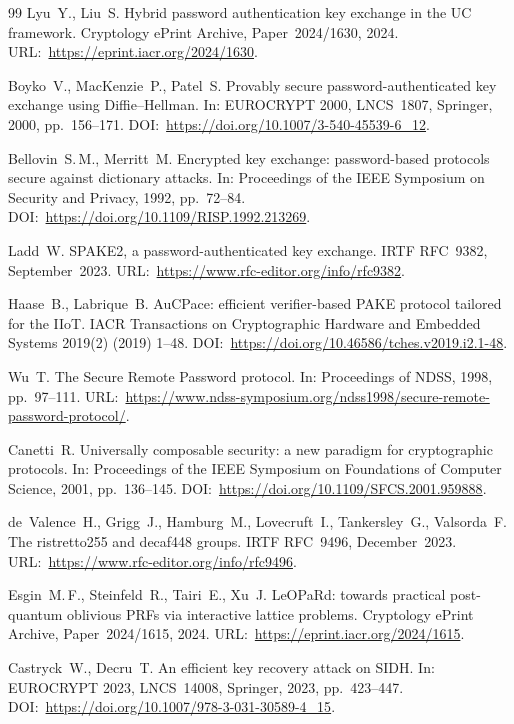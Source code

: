\documentclass[preprint,12pt]{elsarticle}
\theoremstyle{remark}
\begin{document}
\begin{thebibliography}{99}
Lyu~Y., Liu~S.
Hybrid password authentication key exchange in the UC framework.
Cryptology ePrint Archive, Paper~2024/1630, 2024.
URL:~\url{https://eprint.iacr.org/2024/1630}.

Boyko~V., MacKenzie~P., Patel~S.
Provably secure password-authenticated key exchange using Diffie--Hellman.
In: EUROCRYPT 2000, LNCS~1807, Springer, 2000, pp.~156--171.
DOI:~\url{https://doi.org/10.1007/3-540-45539-6_12}.

Bellovin~S.\,M., Merritt~M.
Encrypted key exchange: password-based protocols secure against dictionary attacks.
In: Proceedings of the IEEE Symposium on Security and Privacy, 1992, pp.~72--84.
DOI:~\url{https://doi.org/10.1109/RISP.1992.213269}.

Ladd~W.
SPAKE2, a password-authenticated key exchange.
IRTF RFC~9382, September~2023.
URL:~\url{https://www.rfc-editor.org/info/rfc9382}.

Haase~B., Labrique~B.
AuCPace: efficient verifier-based PAKE protocol tailored for the IIoT.
IACR Transactions on Cryptographic Hardware and Embedded Systems 2019(2) (2019) 1--48.
DOI:~\url{https://doi.org/10.46586/tches.v2019.i2.1-48}.

Wu~T.
The Secure Remote Password protocol.
In: Proceedings of NDSS, 1998, pp.~97--111.
URL:~\url{https://www.ndss-symposium.org/ndss1998/secure-remote-password-protocol/}.

Canetti~R.
Universally composable security: a new paradigm for cryptographic protocols.
In: Proceedings of the IEEE Symposium on Foundations of Computer Science, 2001, pp.~136--145.
DOI:~\url{https://doi.org/10.1109/SFCS.2001.959888}.

de~Valence~H., Grigg~J., Hamburg~M., Lovecruft~I., Tankersley~G.,
Valsorda~F.
The ristretto255 and decaf448 groups.
IRTF RFC~9496, December~2023.
URL:~\url{https://www.rfc-editor.org/info/rfc9496}.

Esgin~M.\,F., Steinfeld~R., Tairi~E., Xu~J.
LeOPaRd: towards practical post-quantum oblivious PRFs via interactive lattice problems.
Cryptology ePrint Archive, Paper~2024/1615, 2024.
URL:~\url{https://eprint.iacr.org/2024/1615}.

Castryck~W., Decru~T.
An efficient key recovery attack on SIDH.
In: EUROCRYPT 2023, LNCS~14008, Springer, 2023, pp.~423--447.
DOI:~\url{https://doi.org/10.1007/978-3-031-30589-4_15}.


\end{thebibliography}
\end{document}
